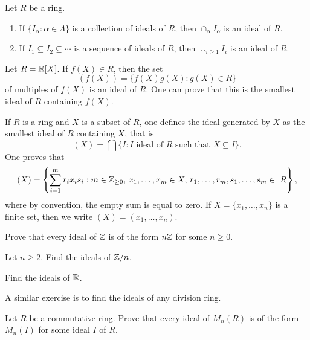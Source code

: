 \begin{exercise}
Let $R$ be a ring. 
\begin{enumerate}
\item If $\{I_\alpha:\alpha\in\Lambda\}$ is a collection of ideals of $R$, then $\cap_{\alpha}I_\alpha$ is an ideal of $R$.  	
\item If $I_1\subseteq I_2\subseteq\cdots$ is a sequence of ideals of $R$, then $\cup_{i\geq1}I_i$ is an ideal of $R$. 
\end{enumerate}
\end{exercise}


\begin{example}
Let $R=\mathbb{R}[X]$. If $f(X)\in R$, then the set 
\[
(f(X))=\{f(X)g(X):g(X)\in R\}
\]
of multiples of $f(X)$ is an ideal of $R$. One can prove that this is the smallest 
ideal of $R$ containing $f(X)$.  	
\end{example}

If $R$ is a ring and $X$ is a subset of $R$, one defines
the ideal generated by $X$ as the smallest ideal of $R$ containing $X$, that is 
\[
(X)=\bigcap\{I:\text{$I$ ideal of $R$ such that $X\subseteq I$}\}.
\]
One proves that 
\[
(X)=\left\{\sum_{i=1}^mr_ix_is_i:m\in\Z_{\geq0},\,x_1,\dots,x_m\in X,\,r_1,\dots,r_m,s_1,\dots,s_m\in R\right\}, 
\]
where by convention, the empty sum is equal to zero. If $X=\{x_1,\dots,x_n\}$ is a finite
set, then we write $(X)=(x_1,\dots,x_n)$. 

\begin{exercise}
\label{xca:ideals_Z}
Prove that every ideal of $\mathbb{Z}$ is of the form $n\mathbb{Z}$ for some $n\geq0$. 	
\end{exercise}

\begin{exercise}
Let $n\geq2$. Find the ideals of $\mathbb{Z}/n$. 	
\end{exercise}

\begin{exercise}
Find the ideals of $\mathbb{R}$.	
\end{exercise}

A similar exercise is to find the ideals of any division ring.  

\begin{exercise}
\label{xca:ideals}
    Let $R$ be a commutative ring. Prove that every ideal of $M_n(R)$ is 
    of the form $M_n(I)$ for some ideal $I$ of $R$. 
\end{exercise}

%    
%    


